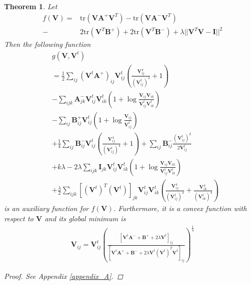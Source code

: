 \documentclass[10pt,journal,compsoc]{IEEEtran}
\newtheorem{theorem}[subsubsection]{Theorem}
\newcommand{\tr}{\mathrm{tr}}
\begin{document}
\begin{theorem}\label{theorem_auxilary}
Let 
\begin{align}
\mathit{f}(\mathbf{V}) =& \tr(\mathbf{V} \mathbf{A}^{+} \mathbf{V}^T) - \tr(\mathbf{V} \mathbf{A}^{-} \mathbf{V}^T )   \\
-& 2 \tr(\mathbf{V}^T \mathbf{B}^{+}) + 2 \tr(\mathbf{V}^T  \mathbf{B}^{-})   + \lambda ||\mathbf{V}^T \mathbf{V} - \mathbf{I}||^2 \nonumber
\end{align}
Then the following function
\begin{align}\label{function_gvv}
&\mathit{g}(\mathbf{V}, \mathbf{V}^t) \\
&=\frac{1}{2}\sum_{ij}(\mathbf{V}^t \mathbf{A}^{+})_{ij} \mathbf{V}_{ij}^{t} (\frac{\mathbf{V}_{ij}^{4}}{(\mathbf{V}_{ij}^{t})^4} + 1) \nonumber \\
&- \sum_{ijk} \mathbf{A}_{jk}^{-} \mathbf{V}_{ij}^{t} \mathbf{V}_{ik}^{t}(1 + \log\frac{\mathbf{V}_{ij} \mathbf{V}_{ik}}{\mathbf{V}_{ij}^t \mathbf{V}_{ik}^t}) \nonumber \\
&- \sum_{ij} \mathbf{B}_{ij}^{+} \mathbf{V}_{ij}^{t}(1 + \log\frac{\mathbf{V}_{ij}}{\mathbf{V}_{ij}^t}) \nonumber \\
&+ \frac{1}{4} \sum_{ij} \mathbf{B}_{ij}^{-}\mathbf{V}_{ij}^t \left(\frac{\mathbf{V}_{ij}^4 }{(\mathbf{V}_{ij}^t)^4} + 1 \right)  + \sum_{ij} \mathbf{B}_{ij}^{-} \frac{ (\mathbf{V}_{ij}^{t})^{2}}{2\mathbf{V}_{ij}^t} \nonumber \\
& + k\lambda -2\lambda\sum_{ijk} \mathbf{I}_{jk}\mathbf{V}_{ij}^t \mathbf{V}_{ik}^t  ( 1 + \log \frac{\mathbf{V}_{ij} \mathbf{V}_{ik}}{\mathbf{V}_{ij}^t \mathbf{V}_{ik}^t} )  \nonumber \\
&+ \frac{\lambda}{2} \sum_{ijk}   [(\mathbf{V}^{t})^T(\mathbf{V}^{t})]_{jk} \mathbf{V}_{ij}^{t} \mathbf{V}_{ik}^{t} \left( \frac{\mathbf{V}_{ij}^{4}}{(\mathbf{V}_{ij}^{t})^{4}} + \frac{\mathbf{V}_{ik}^{4}}{(\mathbf{V}_{ik}^{t})^{4}} \right) \nonumber
\end{align}
is an auxiliary function for $\mathit{f}(\mathbf{V})$. Furthermore, it is a convex function with respect to $\mathbf{V}$ and its global minimum is
\begin{align}\label{update_V}
\mathbf{V}_{ij} = \mathbf{V}_{ij}^{t} \left( \frac{[ \mathbf{V}^{t} \mathbf{A}^{-} +  \mathbf{B}^{+} + 2 \lambda  \mathbf{V}^{t}  ]_{ij} }{[ \mathbf{V}^{t} \mathbf{A}^{+} + \mathbf{B}^{-} + 2 \lambda \mathbf{V}^{t}  (\mathbf{V}^{t})^T  \mathbf{V}^{t} ]_{ij} } \right)^{\frac{1}{4}}
\end{align}

\begin{proof}
See Appendix \ref{appendix_A}.
\end{proof}
\end{theorem}
\end{document}
